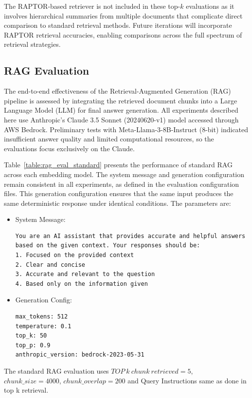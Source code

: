 \documentclass[pdflatex,sn-mathphys-num]{sn-jnl}%
\theoremstyle{thmstyleone}%
\theoremstyle{thmstyletwo}%
\theoremstyle{thmstylethree}%
\begin{document}
The RAPTOR-based retriever is not included in these top-$k$ evaluations as it involves hierarchical summaries from multiple documents that complicate direct comparison to standard retrieval methods. Future iterations will incorporate RAPTOR retrieval accuracies, enabling comparisons across the full spectrum of retrieval strategies.

\subsection{RAG Evaluation}\label{subsec4.3}

The end-to-end effectiveness of the Retrieval-Augmented Generation (RAG) pipeline is assessed by integrating the retrieved document chunks into a Large Language Model (LLM) for final answer generation. All experiments described here use Anthropic's Claude 3.5 Sonnet (20240620-v1) model accessed through AWS Bedrock. Preliminary tests with Meta-Llama-3-8B-Instruct (8-bit) indicated insufficient answer quality and limited computational resources, so the evaluations focus exclusively on the Claude.

Table~\ref{table:rag_eval_standard} presents the performance of standard RAG across each embedding model. The system message and generation configuration remain consistent in all experiments, as defined in the evaluation configuration files. This generation configuration ensures that the same input produces the same deterministic response under identical conditions. The parameters are:

\begin{itemize}
    \item System Message:
\begin{verbatim}
You are an AI assistant that provides accurate and helpful answers
based on the given context. Your responses should be:
1. Focused on the provided context
2. Clear and concise
3. Accurate and relevant to the question
4. Based only on the information given
\end{verbatim}

    \item Generation Config:
\begin{verbatim}
max_tokens: 512
temperature: 0.1
top_k: 50
top_p: 0.9
anthropic_version: bedrock-2023-05-31
\end{verbatim}
\end{itemize}

The standard RAG evaluation uses $TOP\ k\ chunk\ retrieved =5$, $chunk\_size=4000$, $chunk\_overlap=200$ and Query Instructions  same as done in top k retrieval.
\end{document}
